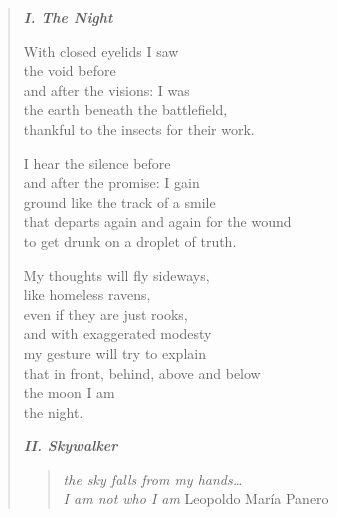 \begin{verse}

{\bfseries\itshape I. The Night}

With closed eyelids I saw\\
the void before\\
and after the visions: I was\\
the earth beneath the battlefield,\\
thankful to the insects for their work.

I hear the silence before\\
and after the promise: I gain\\
ground like the track of a smile\\
that departs again and again for the wound\\
to get drunk on a droplet of truth.

My thoughts will fly sideways,\\
like homeless ravens,\\
even if they are just rooks,\\
and with exaggerated modesty\\
my gesture will try to explain\\
that in front, behind, above and below\\
the moon I am\\
the night.

{\bfseries\itshape II. Skywalker}

\begin{quote}
{\itshape the sky falls from my hands\ldots\\
I am not who I am}
\hspace*{2em}Leopoldo María Panero
\end{quote}


\end{verse}

